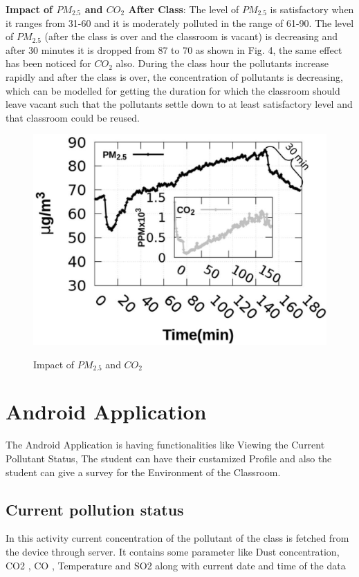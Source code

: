 \textbf{Impact of $PM_{2.5}$ and $CO_2$ After Class}: The level of $PM_{2.5}$ is satisfactory when it ranges from 31-60 and it is moderately polluted in the range of 61-90. The level of $PM_{2.5}$ (after the class is over and the classroom is vacant) is decreasing and after 30 minutes it is dropped from 87 to 70 as shown in Fig. 4, the same effect has been noticed for $CO_2$ also. During the class hour the pollutants increase rapidly and after the class is over, the concentration of pollutants is decreasing, which can be modelled for getting the duration for which the classroom should leave vacant such that the pollutants settle down to at least satisfactory level and that classroom could be reused.
\begin{figure}
\centering
\includegraphics[scale=0.25]{./Presentation3}\\[0.1in]
\label{fig:Impact of $PM_{2.5}$ and $CO_2$}
\caption{Impact of $PM_{2.5}$ and $CO_2$}
\end{figure}

\section{Android Application}

The Android Application is having functionalities like Viewing the Current Pollutant Status, The student can have their custamized Profile and also the student can give a survey for the Environment of the Classroom.

\subsection{Current pollution status}
In this activity current concentration of the pollutant of the class is fetched from the device through server. It contains some parameter like Dust concentration, CO2 , CO , Temperature and SO2 along with current date and time of the data



